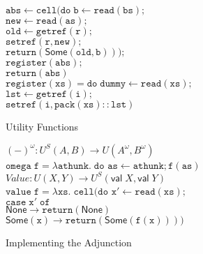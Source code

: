 \documentclass[nocopyrightspace,preprint]{sigplanconf}
\newcommand{\term}[1]{\ensuremath{\mathtt{{#1}}}}
\newcommand{\valtype}[1]{\mathsf{val}\;{#1}}
\newcommand{\None}{\mathsf{None}}
\newcommand{\Some}[1]{\mathsf{Some}({#1})}
\begin{document}
\begin{figure}
{\begin{tabbing}
\>           \>    \>               \>\term{abs \leftarrow cell(do\;}\=\term{b \leftarrow read(bs);} \\
\>           \>    \>               \>                               \>\term{new \leftarrow read(as);} \\
\>           \>    \>               \>                               \>\term{old \leftarrow getref(r);}\\
\>           \>    \>               \>                               \>\term{setref(r, new);}\\
\>           \>    \>               \>                               \>\term{return(\Some{old,b}));}\\
\>           \>    \>               \>\term{register(abs);} \\
\>           \>    \>               \>\term{return(abs)} 
\\[0.5em]

\term{register(xs) = do\;}\=\term{dummy \leftarrow read(xs);}\\
                          \>\term{lst \leftarrow getref(i);} \\
                          \>\term{setref(i, pack(xs) :: lst)} 
\end{tabbing}
}
\caption{Utility Functions}
\label{cokleisli-util}
\end{figure}




\begin{figure}
{\small
\begin{tabbing}
$(-)^\omega : U^S(A,B) \to U(A^\omega, B^\omega)$ \\
\term{omega\;f = \lambda athunk.\;do} \=\term{as \leftarrow athunk; f(as)} 
\\[0.5em]

$\mathit{Value} : U(X,Y) \to U^S(\valtype{X}, \valtype{Y})$ \\[0.2em]
\term{value\;f = \lambda xs.\;cell(do} \=\term{x' \leftarrow read(xs);}\\
                                       \>\term{case\;x'\;of}\\
                                       \>\;\;\=\term{\None \to return(\None)} \\
                                       \>\>    \term{\Some{x} \to return(\Some{f(x)}))}

  
\end{tabbing}
}
\caption{Implementing the Adjunction}
\label{adjoint-implementation}  
\end{figure}
\end{document}
